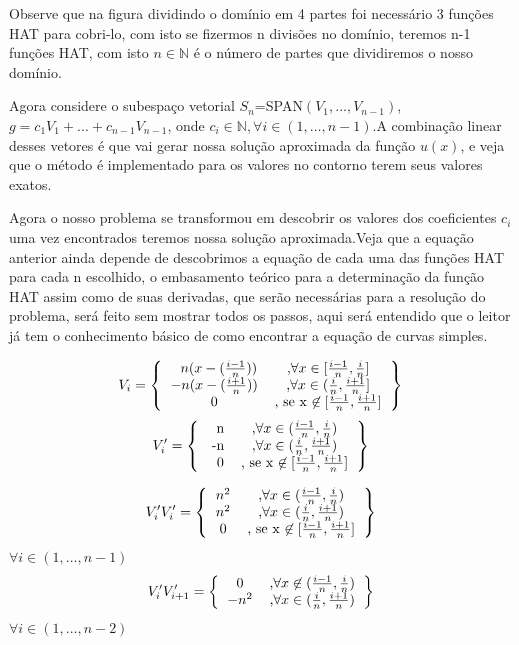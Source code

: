 \documentclass[a4paper]{article}
\begin{document}
 Observe que na figura dividindo o domínio em 4 partes foi necessário 3 funções HAT para cobri-lo, com isto se fizermos n divisões no domínio, teremos n-1 funções HAT, com isto  \(n\in \mathbb{N}\) é o número de partes que dividiremos o nosso domínio.
 
 Agora considere o subespaço vetorial \(S_{n}\)=SPAN\((V_1,...,V_{n-1})\), \(g=c_1V_1+...+c_{n-1}V_{n-1}\), onde \(c_i \in \mathbb{N},  \forall i \in ({1, \dots ,n-1}) \).A combinação linear desses vetores é que vai gerar nossa solução aproximada da função \(u(x)\), e veja que o método é implementado para os valores no contorno terem seus valores exatos.
 
 Agora o nosso problema se transformou em descobrir os valores dos coeficientes \(c_i\) uma vez encontrados teremos nossa solução aproximada.Veja que a equação anterior ainda depende de descobrimos a equação de cada uma das funções HAT para cada n escolhido, o embasamento teórico para a determinação da função HAT assim  como de suas derivadas, que serão necessárias para a resolução do problema, será feito sem mostrar todos os passos, aqui será entendido que o leitor já tem o conhecimento básico de como encontrar a equação de curvas simples.
 
\[V_i=
\left \{
  \begin{tabular}{cc}
 \ \ \(n(x-(\frac{i-1}{n}))\)& ,\(\forall x \in [\frac{i-1}{n},\frac{i}{n}]\)  \\
  \(-n(x-(\frac{i+1}{n}))\) & ,\(\forall x \in (\frac{i}{n}, \frac{i+1}{n}]\) \\
  0 &, se x \(\not\in [\frac{i-1}{n},\frac{i+1}{n}] \)
  \end{tabular}
\right \}
\]  
\[V'_i=
\left \{
  \begin{tabular}{cc}
  \ \ n & ,\(\forall x \in (\frac{i-1}{n},\frac{i}{n})\)  \\
  \ -n & ,\(\forall x \in (\frac{i}{n}, \frac{i+1}{n})\) \\
 \ \ 0 &, se x \(\not\in [\frac{i-1}{n},\frac{i+1}{n}] \)
  \end{tabular}
\right \}
\] 

\[V'_iV'_i=
\left \{
  \begin{tabular}{cc}
  \(n^{2}\) & ,\(\forall x \in (\frac{i-1}{n},\frac{i}{n})\)  \\
  \(n^{2}\) & ,\(\forall x \in (\frac{i}{n}, \frac{i+1}{n})\) \\
  0 &, se x \(\not\in [\frac{i-1}{n},\frac{i+1}{n}] \)
  \end{tabular}
\right \}
\] 
\(\forall i \in (1,...,n-1)\)
\[V'_iV'_{i+1}=
\left \{
  \begin{tabular}{cc}
  0 & ,\(\forall x \not\in (\frac{i-1}{n},\frac{i}{n})\)  \\
  \(-n^{2}\) & ,\(\forall x \in (\frac{i}{n}, \frac{i+1}{n})\) 
  \end{tabular}
\right \}
\] \(\forall i \in (1,...,n-2)\)
\end{document}
